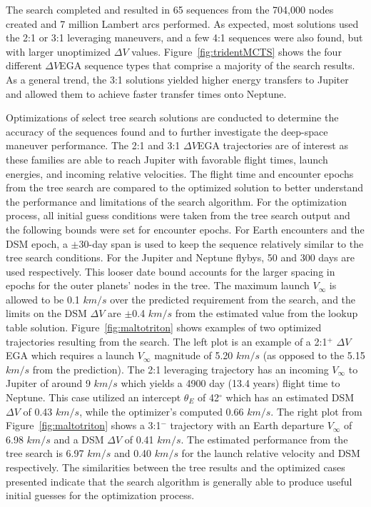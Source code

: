 \documentclass[letterpaper, preprint, paper,11pt]{AAS}	%
\begin{document}
The search completed and resulted in 65 sequences from the 704,000 nodes created and 7 million Lambert arcs performed. As expected, most solutions used the 2:1 or 3:1 leveraging maneuvers, and a few 4:1 sequences were also found, but with larger unoptimized $\Delta V$ values. Figure~\ref{fig:tridentMCTS} shows the four different $\Delta V$EGA sequence types that comprise a majority of the search results. As a general trend, the 3:1 solutions yielded higher energy transfers to Jupiter and allowed them to achieve faster transfer times onto Neptune.

Optimizations of select tree search solutions are conducted to determine the accuracy of the sequences found and to further investigate the deep-space maneuver performance. The 2:1 and 3:1 $\Delta V$EGA trajectories are of interest as these families are able to reach Jupiter with favorable flight times, launch energies, and incoming relative velocities. The flight time and encounter epochs from the tree search are compared to the optimized solution to better understand the performance and limitations of the search algorithm. For the optimization process, all initial guess conditions were taken from the tree search output and the following bounds were set for encounter epochs. For Earth encounters and the DSM epoch, a $\pm$30-day span is used to keep the sequence relatively similar to the tree search conditions. For the Jupiter and Neptune flybys, 50 and 300 days are used respectively. This looser date bound accounts for the larger spacing in epochs for the outer planets' nodes in the tree. The maximum launch $V_\infty$ is allowed to be 0.1 $km/s$ over the predicted requirement from the search, and the limits on the DSM $\Delta V$ are $\pm$0.4 $km/s$ from the estimated value from the lookup table solution. Figure~\ref{fig:maltotriton} shows examples of two optimized trajectories resulting from the search. The left plot is an example of a 2:1$^{+}$ $\Delta V$EGA which requires a launch $V_\infty$ magnitude of 5.20 $km/s$ (as opposed to the \hspace{0.5px} 5.15 $km/s$ from the prediction). The 2:1 leveraging trajectory has an incoming $V_\infty$ to Jupiter of around 9 $km/s$ which yields a 4900 day (13.4 years) flight time to Neptune. This case utilized an intercept $\theta_E$ of 42$^\circ$ which has an estimated DSM $\Delta V$ of 0.43 $km/s$, while the optimizer's computed 0.66 $km/s$. The right plot from Figure~\ref{fig:maltotriton} shows a 3:1$^{-}$ trajectory with an Earth departure $V_\infty$ of 6.98 $km/s$ and a DSM $\Delta V$ of 0.41 $km/s$. The estimated performance from the tree search is 6.97 $km/s$ and 0.40 $km/s$ for the launch relative velocity and DSM respectively. The similarities between the tree results and the optimized cases presented indicate that the search algorithm is generally able to produce useful initial guesses for the optimization process.
\end{document}
